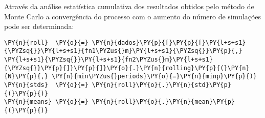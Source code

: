 Através da análise estatística cumulativa dos resultados obtidos pelo
método de Monte Carlo a convergência do processo com o aumento do número
de simulações pode ser determinada:

    \begin{tcolorbox}[breakable, size=fbox, boxrule=1pt, pad at break*=1mm,colback=cellbackground, colframe=cellborder]
\begin{Verbatim}[commandchars=\\\{\}]
\PY{n}{roll}  \PY{o}{=} \PY{n}{dados}\PY{p}{[}\PY{p}{[}\PY{l+s+s1}{\PYZsq{}}\PY{l+s+s1}{fn1\PYZus{}m}\PY{l+s+s1}{\PYZsq{}}\PY{p}{,} \PY{l+s+s1}{\PYZsq{}}\PY{l+s+s1}{fn2\PYZus{}m}\PY{l+s+s1}{\PYZsq{}}\PY{p}{]}\PY{p}{]}\PY{o}{.}\PY{n}{rolling}\PY{p}{(}\PY{n}{N}\PY{p}{,} \PY{n}{min\PYZus{}periods}\PY{o}{=}\PY{n}{minp}\PY{p}{)}
\PY{n}{stds}  \PY{o}{=} \PY{n}{roll}\PY{o}{.}\PY{n}{std}\PY{p}{(}\PY{p}{)}
\PY{n}{means} \PY{o}{=} \PY{n}{roll}\PY{o}{.}\PY{n}{mean}\PY{p}{(}\PY{p}{)}
\end{Verbatim}
\end{tcolorbox}


